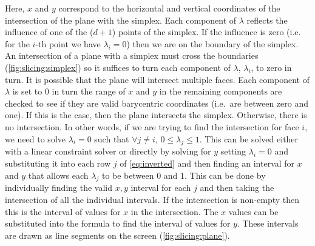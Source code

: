 Here, $x$ and $y$ correspond to the horizontal and vertical coordinates of the
intersection of the plane with the simplex. Each component of $\lambda$
reflects the influence of one of the ($d+1$) points of the simplex. If the
influence is zero (i.e. for the $i$-th point we have $\lambda_i=0$) then we are on
the boundary of the simplex.  An intersection of a plane with a
simplex must cross the boundaries
(\autoref{fig:slicing:simplex}) so it suffices to turn each
component of $\lambda$, $\lambda_i$, to zero in turn.  It is possible that the plane will
intersect multiple faces. Each component of $\lambda$ is set to $0$ in turn
the range of $x$ and $y$ in the remaining components are checked
to see if they are valid
barycentric coordinates (i.e.\ are between zero and one).  If this is the case,
then the plane intersects the simplex.  Otherwise, there is no intersection. In
other words, if we are trying to find the intersection for face $i$, we need to
solve $\lambda_i = 0$ such that $\forall j \ne i$, $0 \le \lambda_j \le 1$.
This can be solved either with a linear constraint solver or directly by
solving for $y$ setting $\lambda_i = 0$ and substituting it into each row $j$ of \autoref{eq:inverted}
and then finding an interval for $x$ and $y$ that allows each
$\lambda_j$ to be between $0$ and $1$.  This can be done by individually finding
the valid $x, y$ interval for each $j$ and then taking the intersection of all the
individual intervals. If the intersection is non-empty then this is the interval
of values for $x$ in the intersection. The $x$ values can be substituted into
the formula to find the
interval of values for $y$. These intervals are drawn as line segments
on the screen (\autoref{fig:slicing:plane}). 

